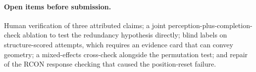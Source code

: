 \documentclass[11pt]{article}
\newcommand{\runin}[1]{\paragraph{#1}}
\begin{document}
\runin{Open items before submission.}
Human verification of three attributed claims; a joint
perception-plus-completion-check ablation to test the redundancy
hypothesis directly; blind labels on structure-scored attempts, which
requires an evidence card that can convey geometry; a mixed-effects
cross-check alongside the permutation test; and repair of the RCON
response checking that caused the position-reset failure.
\end{document}
